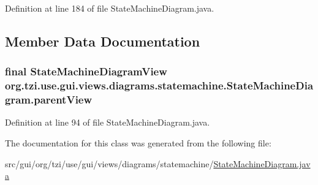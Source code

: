Definition at line 184 of file State\-Machine\-Diagram.\-java.



\subsection{Member Data Documentation}
\hypertarget{classorg_1_1tzi_1_1use_1_1gui_1_1views_1_1diagrams_1_1statemachine_1_1_state_machine_diagram_a75a1431072f781446498c676bfb94584}{
\subsubsection[{parent\-View}]{\setlength{\rightskip}{0pt plus 5cm}final {\bf State\-Machine\-Diagram\-View} org.\-tzi.\-use.\-gui.\-views.\-diagrams.\-statemachine.\-State\-Machine\-Diagram.\-parent\-View\hspace{0.3cm}{\ttfamily [protected]}}}\label{classorg_1_1tzi_1_1use_1_1gui_1_1views_1_1diagrams_1_1statemachine_1_1_state_machine_diagram_a75a1431072f781446498c676bfb94584}


Definition at line 94 of file State\-Machine\-Diagram.\-java.



The documentation for this class was generated from the following file\-:\begin{DoxyCompactItemize}
\item 
src/gui/org/tzi/use/gui/views/diagrams/statemachine/\hyperlink{_state_machine_diagram_8java}{State\-Machine\-Diagram.\-java}\end{DoxyCompactItemize}
